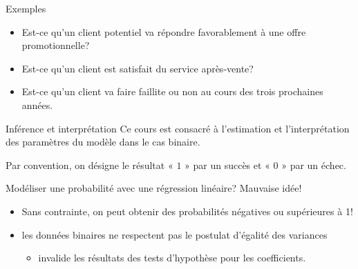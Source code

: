 \documentclass[
  ignorenonframetext,
]{beamer}
\providecommand{\tightlist}{%
  \setlength{\itemsep}{0pt}\setlength{\parskip}{0pt}}\usepackage{longtable,booktabs,array}
\begin{document}
\begin{frame}{Exemples}
\protect\hypertarget{exemples}{}
\begin{itemize}
\tightlist
\item
  Est-ce qu'un client potentiel va répondre favorablement à une offre
  promotionnelle?
\item
  Est-ce qu'un client est satisfait du service après-vente?
\item
  Est-ce qu'un client va faire faillite ou non au cours des trois
  prochaines années.
\end{itemize}
\end{frame}

\begin{frame}{Inférence et interprétation}
\protect\hypertarget{infuxe9rence-et-interpruxe9tation}{}
Ce cours est consacré à l'estimation et l'interprétation des paramètres
du modèle dans le cas binaire.

Par convention, on désigne le résultat « \(1\) » par un succès et «
\(0\) » par un échec.
\end{frame}

\begin{frame}{Modéliser une probabilité avec une régression linéaire?}
\protect\hypertarget{moduxe9liser-une-probabilituxe9-avec-une-ruxe9gression-linuxe9aire}{}
Mauvaise idée!

\begin{itemize}
\tightlist
\item
  Sans contrainte, on peut obtenir des probabilités négatives ou
  supérieures à 1!
\item
  les données binaires ne respectent pas le postulat d'égalité des
  variances

  \begin{itemize}
  \tightlist
  \item
    invalide les résultats des tests d'hypothèse pour les coefficients.
  \end{itemize}
\end{itemize}
\end{frame}
\end{document}
